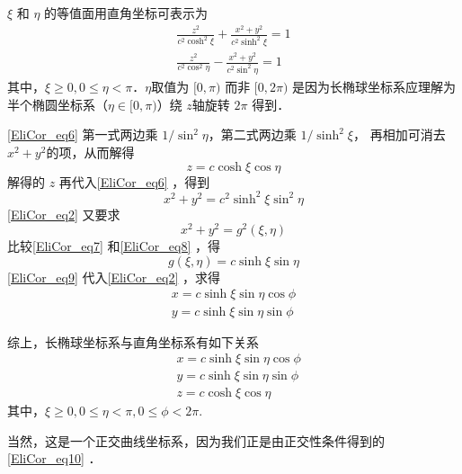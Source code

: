 $\xi$ 和 $\eta$ 的等值面用直角坐标可表示为
\begin{equation}\label{EliCor_eq6}
\begin{aligned}
\frac{z^2}{c^2\cosh^2\xi}+\frac{x^2+y^2}{c^2\sinh^2\xi}=1\\
\frac{z^2}{c^2\cos^2\eta}-\frac{x^2+y^2}{c^2\sin^2\eta}=1
\end{aligned}
\end{equation}
其中，$\xi\geq 0,0\leq\eta<\pi$．$\eta$取值为 $[0,\pi)$ 而非 $[0,2\pi)$ 是因为长椭球坐标系应理解为半个椭圆坐标系（$\eta\in[0,\pi)$）绕 $z$轴旋转 $2\pi$ 得到．

\autoref{EliCor_eq6} 第一式两边乘 $1/\sin^2\eta$，第二式两边乘 $1/\sinh^2\xi$， 再相加可消去$x^2+y^2$的项，从而解得
\begin{equation}
z=c\cosh\xi\cos\eta
\end{equation}
 解得的 $z$ 再代入\autoref{EliCor_eq6} ，得到
 \begin{equation}\label{EliCor_eq7}
 x^2+y^2=c^2\sinh^2\xi\sin^2\eta
 \end{equation}
 \autoref{EliCor_eq2} 又要求
 \begin{equation}\label{EliCor_eq8}
 x^2+y^2=g^2(\xi,\eta)
 \end{equation}
 比较\autoref{EliCor_eq7} 和\autoref{EliCor_eq8} ，得
 \begin{equation}\label{EliCor_eq9}
 g(\xi,\eta)=c\sinh\xi\sin\eta
 \end{equation}
 \autoref{EliCor_eq9} 代入\autoref{EliCor_eq2} ，求得
 \begin{equation}
 \begin{aligned}
 x=c\sinh\xi\sin\eta\cos\phi\\
y=c\sinh\xi\sin\eta\sin\phi
 \end{aligned}
 \end{equation}
 
 综上，长椭球坐标系与直角坐标系有如下关系
 \begin{equation}\label{EliCor_eq10}
 \begin{aligned}
 &x=c\sinh\xi\sin\eta\cos\phi\\
&y=c\sinh\xi\sin\eta\sin\phi\\
&z=c\cosh\xi\cos\eta
 \end{aligned}
 \end{equation}
 其中，$\xi\geq 0,0\leq\eta<\pi,0\leq\phi<2\pi$.
 
 当然，这是一个正交曲线坐标系，因为我们正是由正交性条件得到的\autoref{EliCor_eq10} ．

